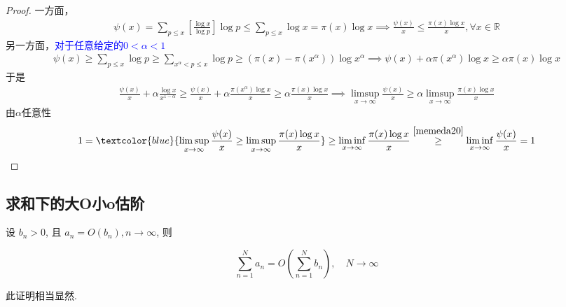 \begin{proof}
    一方面，
    \begin{align}\label{memeda20}
        \psi(x)=\sum_{p\le x}\left[\frac{\log x}{\log p}\right]\log p\le \sum_{p\le x}\log x=\pi (x)\log x\implies \frac{\psi(x)}{x}\le \frac{\pi(x)\log x}{x},\forall x\in \mathbb{R}
    \end{align}
    另一方面，\textcolor{blue}{对于任意给定的$0<\alpha<1$ }
    \begin{align*}
        \psi(x)\ge \sum_{p\le x}\log p\ge \sum_{x^\alpha<p\le x}\log p\ge (\pi(x)-\pi(x^\alpha))\log x^\alpha\implies \psi(x)+\alpha\pi (x^\alpha)\log x\ge \alpha\pi(x)\log x
    \end{align*}
    于是
    \begin{align*}
        \frac{\psi(x)}{x}+\alpha\frac{\log x}{x^{1-\alpha}}\ge \frac{\psi(x)}{x}+\alpha\frac{\pi(x^\alpha)\log x}{x}\ge \alpha \frac{\pi(x)\log x}{x}\implies \limsup_{x\to \infty}\frac{\psi(x)}{x}\ge \alpha\limsup_{x\to \infty}\frac{\pi(x)\log x}{x}
    \end{align*}
    由$\alpha $任意性
    \begin{align*}
        1=\textcolor{blue}{\limsup_{x\to \infty}\frac{\psi(x)}{x}\ge  \limsup_{x\to \infty}\frac{\pi(x)\log x}{x}}\ge \liminf_{x\to \infty}\frac{\pi(x)\log x}{x}\overset{\cref{memeda20}}{\ge} \liminf_{x\to \infty}\frac{\psi(x)}{x}=1
    \end{align*}

\end{proof}

\subsection{求和下的大O小o估阶}

\begin{proposition}
    设 $b_n>0$, 且 $a_n=O\left(b_n\right), n \rightarrow \infty$, 则

    $$
        \sum_{n=1}^N a_n=O\left(\sum_{n=1}^N b_n\right), \quad N \rightarrow \infty
    $$

\end{proposition}

\begin{note}
    此证明相当显然.
\end{note}

